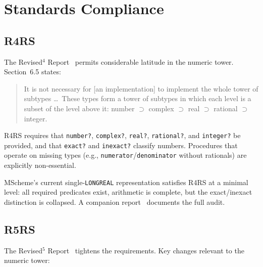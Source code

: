 \documentclass[12pt]{report}
\begin{document}
\chapter{Standards Compliance}
\label{ch:standards}

\section{R4RS}

The Revised$^4$ Report~\cite{r4rs} permits considerable latitude in
the numeric tower.  Section~6.5 states:

\begin{quote}
  It is not necessary for [an implementation] to implement the
  whole tower of subtypes \ldots\ These types form a tower of
  subtypes in which each level is a subset of the level above it:
  number $\supset$ complex $\supset$ real $\supset$ rational $\supset$
  integer.
\end{quote}

R4RS requires that {\tt number?}, {\tt complex?}, {\tt real?},
{\tt rational?}, and {\tt integer?} be provided, and that {\tt exact?}
and {\tt inexact?} classify numbers.  Procedures that operate on
missing types (e.g., {\tt numerator}/{\tt denominator} without
rationals) are explicitly non-essential.

MScheme's current single-{\tt LONGREAL} representation satisfies R4RS
at a minimal level: all required predicates exist, arithmetic is
complete, but the exact/inexact distinction is collapsed.  A companion
report~\cite{r4rsconf} documents the full audit.

\section{R5RS}

The Revised$^5$ Report~\cite{r5rs} tightens the requirements.  Key
changes relevant to the numeric tower:
\end{document}
